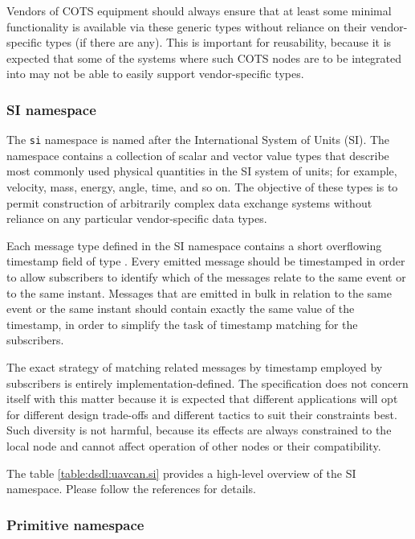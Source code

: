 Vendors of COTS equipment should always ensure that at least some minimal functionality is available
via these generic types without reliance on their vendor-specific types (if there are any).
This is important for reusability, because it is expected that some of the systems where such COTS nodes are
to be integrated into may not be able to easily support vendor-specific types.

\subsubsection{SI namespace}

The \verb|si| namespace is named after the International System of Units (SI).
The namespace contains a collection of scalar and vector value types that describe most commonly used
physical quantities in the SI system of units; for example, velocity, mass, energy, angle, time, and so on.
The objective of these types is to permit construction of arbitrarily complex data exchange systems without
reliance on any particular vendor-specific data types.

Each message type defined in the SI namespace contains a short overflowing timestamp field of type
.
Every emitted message should be timestamped in order to allow subscribers to identify which of the messages
relate to the same event or to the same instant.
Messages that are emitted in bulk in relation to the same event or the same instant should contain
exactly the same value of the timestamp,
in order to simplify the task of timestamp matching for the subscribers.

The exact strategy of matching related messages by timestamp employed by subscribers is entirely
implementation-defined.
The specification does not concern itself with this matter because it is expected that different applications
will opt for different design trade-offs and different tactics to suit their constraints best.
Such diversity is not harmful, because its effects are always constrained to the local node and cannot affect
operation of other nodes or their compatibility.

The table \ref{table:dsdl:uavcan.si} provides a high-level overview of the SI namespace.
Please follow the references for details.


\subsubsection{Primitive namespace}

